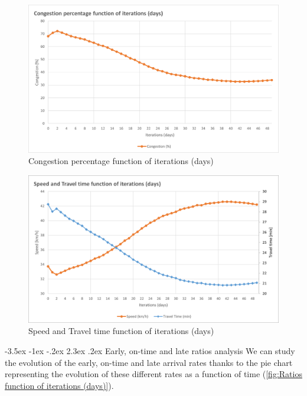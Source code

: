 \documentclass[a4paper, 12pt,oneside]{article}
\makeatletter
\renewcommand{\subsection}{\@startsection {subsection}{1}{\z@}%
             {-3.5ex \@plus -1ex \@minus -.2ex}%
             {2.3ex \@plus.2ex}%
             {\normalfont\normalsize\bfseries}}
\makeatother
\begin{document}
\begin{minipage}[c]{0.5\textwidth}
\begin{figure}[H]
    \centering
    \includegraphics[width=1\textwidth]{Images/Step2/Congestion_percentage_function_iterations.png}
    \caption{Congestion percentage function of iterations (days)}
    \label{fig:Congestion percentage function of iterations (days)}
\end{figure}
\end{minipage}
\begin{minipage}[c]{0.5\textwidth}
\begin{figure}[H]
    \centering
    \includegraphics[width=1\textwidth]{Images/Step2/Speed_travel_time_function_iterations.png}
    \caption{Speed and Travel time function of iterations (days)}
    \label{fig:Speed and Travel time function of iterations (days)}
\end{figure}
\end{minipage}



\subsection{Early, on-time and late ratios analysis}
We can study the evolution of the early, on-time and late arrival rates thanks to the pie chart representing the evolution of these different rates as a function of time (\ref{fig:Ratios function of iterations (days)}).\\
\end{document}
